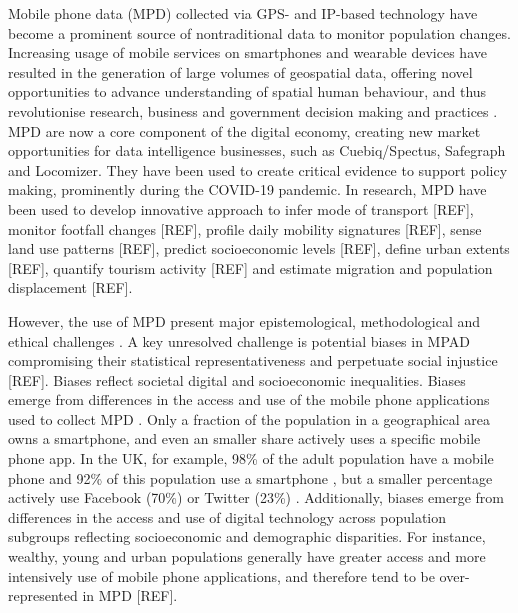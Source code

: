 \documentclass[]{rsos}%
\begin{document}
Mobile phone data (MPD) collected via GPS- and IP-based technology
have become a prominent source of nontraditional data
to monitor population changes. Increasing usage of mobile
services on smartphones and wearable devices have resulted in the
generation of large volumes of geospatial data, offering novel
opportunities to advance understanding of spatial human behaviour, and
thus revolutionise research, business and government decision making and
practices \citep{rowe23-bigdata}. MPD are now a core component of the digital
economy, creating new market opportunities for data intelligence
businesses, such as Cuebiq/Spectus, Safegraph and Locomizer.
They have been used to create critical evidence to support policy making,
prominently during the COVID-19 pandemic.
In research, MPD have been used to develop innovative approach to infer
mode of transport {[}REF{]}, monitor footfall changes {[}REF{]}, profile daily mobility signatures {[}REF{]},
sense land use patterns {[}REF{]}, predict socioeconomic levels {[}REF{]},
define urban extents {[}REF{]}, quantify tourism activity {[}REF{]} and estimate
migration and population displacement {[}REF{]}.

However, the use of MPD present major epistemological, methodological
and ethical challenges \citep{rowe23-bigdata}. A key unresolved challenge is
potential biases in MPAD compromising their statistical
representativeness and perpetuate social injustice {[}REF{]}. Biases reflect
societal digital and socioeconomic inequalities. Biases emerge from
differences in the access and use of the mobile phone applications used
to collect MPD \citep{wesolowski13-biases}. Only a fraction of the
population in a geographical area owns a smartphone, and even an smaller share
actively uses a specific mobile phone app. In the UK, for example, 98\% of
the adult population have a mobile phone and 92\% of this population use
a smartphone \citep{ofcom23}, but a smaller percentage actively use Facebook
(70\%) or Twitter (23\%) \citep{statista24}. Additionally, biases emerge from
differences in the access and use of digital technology across
population subgroups reflecting socioeconomic and demographic
disparities. For instance, wealthy, young and urban populations
generally have greater access and more intensively use of mobile phone
applications, and therefore tend to be over-represented in MPD {[}REF{]}.
\end{document}
